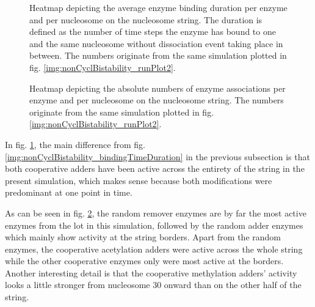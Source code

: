              \begin{figure}[htpb!]
                \centering
                \caption{Heatmap depicting the average enzyme binding duration per enzyme and per nucleosome on the nucleosome string. The duration is defined as the number of time steps the enzyme has bound to one and the same nucleosome without dissociation event taking place in between. The numbers originate from the same simulation plotted in fig. \ref{img:nonCyclBistability_runPlot2}.}
                \label{img:coopAssocBindingDuration}
            \end{figure}

            \begin{figure}[htpb!]
                \centering
                \caption{Heatmap depicting the absolute numbers of enzyme associations per enzyme and per nucleosome on the nucleosome string. The numbers originate from the same simulation plotted in fig. \ref{img:nonCyclBistability_runPlot2}.}
                \label{img:coopAssocBindingNumbers} %
            \end{figure}

            In fig. \ref{img:coopAssocBindingDuration}, the main difference from fig. \ref{img:nonCyclBistability_bindingTimeDuration} in the previous subsection is that both cooperative adders have been active across the entirety of the string in the present simulation, which makes sense because both modifications were predominant at one point in time.

            As can be seen in fig. \ref{img:coopAssocBindingNumbers}, the random remover enzymes are by far the most active enzymes from the lot in this simulation, followed by the random adder enzymes which mainly show activity at the string borders. Apart from the random enzymes, the cooperative acetylation adders were active across the whole string while the other cooperative enzymes only were most active at the borders. Another interesting detail is that the cooperative methylation adders' activity looks a little stronger from nucleosome 30 onward than on the other half of the string.

